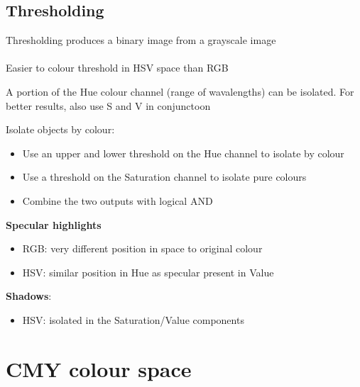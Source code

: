 \documentclass{article}[18pt]
\begin{document}
\subsection{Thresholding}
Thresholding produces a binary image from a grayscale image\\
\\
Easier to colour threshold in HSV space than RGB
\begin{defin}
	A portion of the Hue colour channel (range of wavalengths) can be isolated. For better results, also use S and V in conjunctoon
\end{defin}
Isolate objects by colour:
\begin{itemize}
	\item Use an upper and lower threshold on the Hue channel to isolate by colour
	\item Use a threshold on the Saturation channel to isolate pure colours
	\item Combine the two outputs with logical AND
\end{itemize}
\textbf{Specular highlights}
\begin{itemize}
	\item RGB: very different position in space to original colour
	\item HSV: similar position in Hue as specular present in Value
\end{itemize}
\textbf{Shadows}:
\begin{itemize}
	\item HSV: isolated in the Saturation/Value components
\end{itemize}
\section{CMY colour space}
\end{document}
